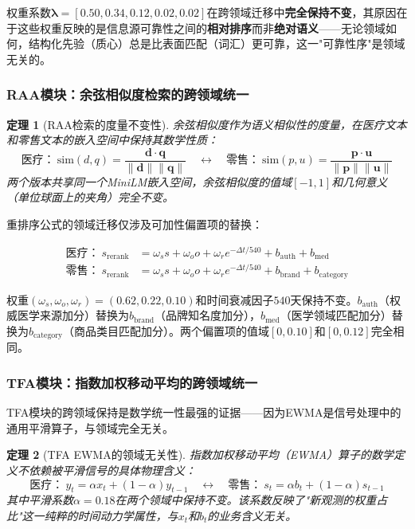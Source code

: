 \documentclass[11pt,a4paper]{ctexart}
\newtheorem{theorem}{定理}[section]
\theoremstyle{remark}
\begin{document}
权重系数$\boldsymbol{\lambda} = [0.50, 0.34, 0.12, 0.02, 0.02]$在跨领域迁移中\textbf{完全保持不变}，其原因在于这些权重反映的是信息源可靠性之间的\textbf{相对排序}而非\textbf{绝对语义}——无论领域如何，结构化先验（质心）总是比表面匹配（词汇）更可靠，这一"可靠性序"是领域无关的。

\subsubsection{RAA模块：余弦相似度检索的跨领域统一}

\begin{theorem}[RAA检索的度量不变性]
余弦相似度作为语义相似性的度量，在医疗文本和零售文本的嵌入空间中保持其数学性质：
\begin{equation}
\text{医疗：}\ \text{sim}(d, q) = \frac{\mathbf{d} \cdot \mathbf{q}}{\|\mathbf{d}\| \|\mathbf{q}\|} \quad \longleftrightarrow \quad \text{零售：}\ \text{sim}(p, u) = \frac{\mathbf{p} \cdot \mathbf{u}}{\|\mathbf{p}\| \|\mathbf{u}\|}
\end{equation}
两个版本共享同一个MiniLM嵌入空间，余弦相似度的值域$[-1, 1]$和几何意义（单位球面上的夹角）完全不变。
\end{theorem}

重排序公式的领域迁移仅涉及可加性偏置项的替换：

\begin{align}
\text{医疗：}\ s_{\text{rerank}} &= \omega_s s + \omega_o o + \omega_r e^{-\Delta t/540} + b_{\text{auth}} + b_{\text{med}} \\
\text{零售：}\ s_{\text{rerank}} &= \omega_s s + \omega_o o + \omega_r e^{-\Delta t/540} + b_{\text{brand}} + b_{\text{category}}
\end{align}

权重$(\omega_s, \omega_o, \omega_r) = (0.62, 0.22, 0.10)$和时间衰减因子$540$天保持不变。$b_{\text{auth}}$（权威医学来源加分）替换为$b_{\text{brand}}$（品牌知名度加分），$b_{\text{med}}$（医学领域匹配加分）替换为$b_{\text{category}}$（商品类目匹配加分）。两个偏置项的值域$[0, 0.10]$和$[0, 0.12]$完全相同。

\subsubsection{TFA模块：指数加权移动平均的跨领域统一}

TFA模块的跨领域保持是数学统一性最强的证据——因为EWMA是信号处理中的通用平滑算子，与领域完全无关。

\begin{theorem}[TFA EWMA的领域无关性]
指数加权移动平均（EWMA）算子的数学定义不依赖被平滑信号的具体物理含义：
\begin{equation}
\text{医疗：}\ y_t = \alpha x_t + (1-\alpha) y_{t-1} \quad \longleftrightarrow \quad \text{零售：}\ s_t = \alpha b_t + (1-\alpha) s_{t-1}
\end{equation}
其中平滑系数$\alpha = 0.18$在两个领域中保持不变。该系数反映了"新观测的权重占比"这一纯粹的时间动力学属性，与$x_t$和$b_t$的业务含义无关。
\end{theorem}
\end{document}
